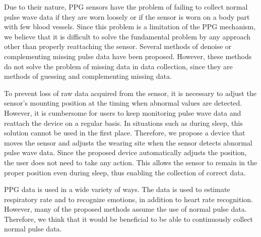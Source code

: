 \documentclass[sigconf]{acmart}
\begin{document}
Due to their nature, PPG sensors have the problem of failing to collect normal pulse wave data if they are worn loosely or if the sensor is worn on a body part with few blood vessels. Since this problem is a limitation of the PPG mechanism, we believe that it is difficult to solve the fundamental problem by any approach other than properly reattaching the sensor. Several methods of denoise or complementing missing pulse data have been proposed. However, these methods do not solve the problem of missing data in data collection, since they are methods of guessing and complementing missing data.\par

To prevent loss of raw data acquired from the sensor, it is necessary to adjust the sensor's mounting position at the timing when abnormal values are detected. However, it is cumbersome for users to keep monitoring pulse wave data and reattach the device on a regular basis. In situations such as during sleep, this solution cannot be used in the first place. Therefore, we propose a device that moves the sensor and adjusts the wearing site when the sensor detects abnormal pulse wave data. Since the proposed device automatically adjusts the position, the user does not need to take any action. This allows the sensor to remain in the proper position even during sleep, thus enabling the collection of correct data.\par

PPG data is used in a wide variety of ways. The data is used to estimate respiratory rate and to recognize emotions, in addition to heart rate recognition. However, many of the proposed methods assume the use of normal pulse data. Therefore, we think that it would be beneficial to be able to continuously collect normal pulse data.\par
\end{document}

